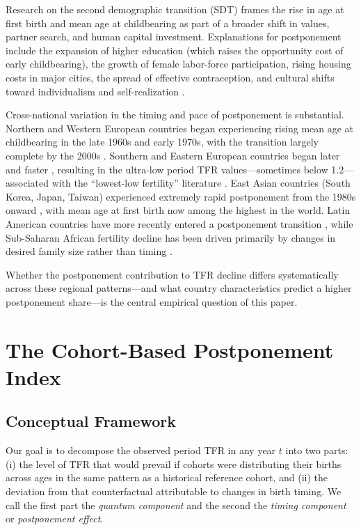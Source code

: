 \documentclass[12pt]{article}
\begin{document}
Research on the second demographic transition (SDT) \citep{LesthaegheVan2002}
frames the rise in age at first birth and mean age at childbearing as
part of a broader shift in values, partner search, and human capital
investment.  Explanations for postponement include the expansion of
higher education (which raises the opportunity cost of early
childbearing), the growth of female labor-force participation, rising
housing costs in major cities, the spread of effective contraception,
and cultural shifts toward individualism and self-realization
\citep{Blossfeld2009,Mills2011}.

Cross-national variation in the timing and pace of postponement is
substantial.  Northern and Western European countries began
experiencing rising mean age at childbearing in the late 1960s and
early 1970s, with the transition largely complete by the 2000s
\citep{Sobotka2017}.  Southern and Eastern European countries began
later and faster \citep{Kohler2002}, resulting in the ultra-low period
TFR values---sometimes below 1.2---associated with the ``lowest-low
fertility'' literature \citep{Kohler2002b}.  East Asian countries
(South Korea, Japan, Taiwan) experienced extremely rapid postponement
from the 1980s onward \citep{Jones2007,Raymo2015}, with mean age at
first birth now among the highest in the world.  Latin American
countries have more recently entered a postponement transition
\citep{Cavenaghi2011}, while Sub-Saharan African fertility decline has
been driven primarily by changes in desired family size rather than
timing \citep{Westoff2011}.

Whether the postponement contribution to TFR decline differs
systematically across these regional patterns---and what country
characteristics predict a higher postponement share---is the central
empirical question of this paper.


\section{The Cohort-Based Postponement Index}
\label{sec:methods}

\subsection{Conceptual Framework}

Our goal is to decompose the observed period TFR in any year $t$ into
two parts: (i) the level of TFR that would prevail if cohorts were
distributing their births across ages in the same pattern as a
historical reference cohort, and (ii) the deviation from that
counterfactual attributable to changes in birth timing.  We call the
first part the \emph{quantum component} and the second the
\emph{timing component} or \emph{postponement effect}.
\end{document}
